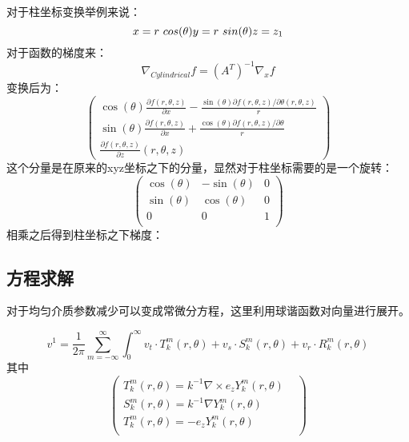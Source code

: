 \documentclass[UTF8]{article}
\begin{document}
对于柱坐标变换举例来说：\label{article1}
\begin{equation}
x=r \ cos(\theta)\\
y=r \ sin(\theta)\\
z=z_1
\end{equation}
对于函数的梯度来：
\begin{equation}
\nabla_{Cylindrical} f=(A^T)^{-1}\nabla_x f
\end{equation}
变换后为：
\begin{equation}
\left(
\begin{array}{ccc}
\cos (\theta ) \frac{\partial f(r,\theta ,z)}{\partial x}-\frac{\sin (\theta ) {\partial f(r,\theta ,z)}/{\partial \theta}(r,\theta ,z)}{r}\\
\sin (\theta ) \frac{\partial f(r,\theta ,z)}{\partial x}+\frac{\cos (\theta ) {\partial f(r,\theta ,z)}/{\partial \theta}}{r}\\
\frac{\partial f(r,\theta,z)}{\partial z}(r,\theta ,z)
\end{array}
\right)
\end{equation}
这个分量是在原来的xyz坐标之下的分量，显然对于柱坐标需要的是一个旋转：
\begin{equation}
\left(
\begin{array}{ccc}
 \cos (\theta ) & -\sin (\theta ) & 0 \\
 \sin (\theta ) & \cos (\theta ) & 0 \\
 0 & 0 & 1 \\
\end{array}
\right)
\end{equation}
相乘之后得到柱坐标之下梯度：
\begin{equation}
[\frac{\partial f(r,\theta,z)}{\partial r},\frac{1}{r}\frac{\partial f(r,\theta,z)}{\partial r},\frac{\partial f(r,\theta,z)}{\partial r}]
\end{equation}

        \subsection{方程求解}
对于均匀介质参数减少可以变成常微分方程，这里利用球谐函数对向量进行展开。

\begin{equation}
v^1=\frac{1}{2\pi}\sum_{m=-\infty}^{\infty}\int_0^\infty{v_t\cdot T_k^m(r,\theta)+v_s\cdot S_k^m(r,\theta)+v_r\cdot R_k^m(r,\theta)}
\end{equation}
其中
\begin{equation}
\left(
\begin{array}{ccc}
        T^m_k(r,\theta)=k^{-1}\nabla\times e_z Y_k^m(r,\theta) & \\ 
        S^m_k(r,\theta)=k^{-1}\nabla Y_k^m(r,\theta) & \\ 
        T^m_k(r,\theta)=- e_z Y_k^m(r,\theta) & \\
\end{array}
\right)
\end{equation}
\end{document}
